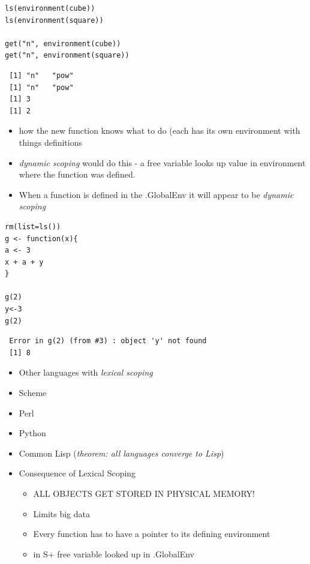 \documentclass[11pt]{article}
\begin{document}
\begin{verbatim}
ls(environment(cube))
ls(environment(square))

get("n", environment(cube))
get("n", environment(square))
\end{verbatim}

\begin{verbatim}
 [1] "n"   "pow"
 [1] "n"   "pow"
 [1] 3
 [1] 2
\end{verbatim}

\begin{itemize}
\item how the new function knows what to do (each has its own environment
  with things definitions
\item \emph{dynamic scoping} would do this - a free variable looks up value in
  environment where the function was defined.
\item When a function is defined in the .GlobalEnv it will appear to be
  \emph{dynamic scoping}
\end{itemize}


\begin{verbatim}
rm(list=ls())
g <- function(x){
a <- 3
x + a + y
}

g(2)
y<-3
g(2)
\end{verbatim}

\begin{verbatim}
 Error in g(2) (from #3) : object 'y' not found
 [1] 8
\end{verbatim}

\begin{itemize}
\item Other languages with \emph{lexical scoping}
\item Scheme
\item Perl
\item Python
\item Common Lisp (\emph{theorem: all languages converge to Lisp})
\end{itemize}
\begin{itemize}

\item Consequence of Lexical Scoping
\label{sec-2-2-5-1}%
\begin{itemize}
\item ALL OBJECTS GET STORED IN PHYSICAL MEMORY!
\item Limits big data
\item Every function has to have a pointer to its defining environment
\item in S+ free variable looked up in .GlobalEnv
\end{itemize}

\end{itemize} %
\end{document}
